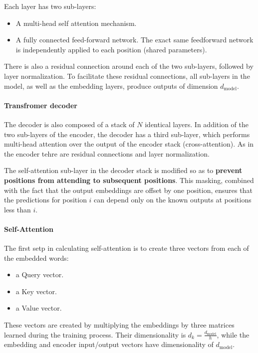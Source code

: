 Each layer has two sub-layers:
\begin{itemize}
  \item A multi-head self attention mechanism.
  \item A fully connected feed-forward network. The exact same feedforward network is independently applied to each position (shared parameters).
\end{itemize}

There is also a residual connection around each of the two sub-layers, followed by layer normalization.
To facilitate these residual connections, all sub-layers in the model, as well as the embedding layers, produce outputs of dimension $d_{\text{model}}$.

\paragraph{Transfromer decoder}
The decoder is also composed of a stack of $N$ identical layers.
In addition of the two sub-layers of the encoder, the decoder has a third sub-layer, which performs multi-head attention over the output of the encoder stack (cross-attention).
As in the encoder tehre are residual connections and layer normalization.

The self-attention sub-layer in the decoder stack is modified so as to \textbf{prevent positions from attending to subsequent positions}.
This masking, combined with the fact that the output embeddings are offset by one position, ensures that the predictions for position $i$ can depend only on the known outputs at positions less than $i$.

\paragraph{Self-Attention}
The first setp in calculating self-attention is to create three vectors from each of the embedded words:
\begin{itemize}
  \item a Query vector.
  \item a Key vector.
  \item a Value vector.
\end{itemize}

These vectors are created by multiplying the embeddings by three matrices learned during the training process.
Their dimensionality is $d_k = \frac{d_{\text{model}}}{h}$, while the embedding and encoder input/output vectors have dimensionality of $d_{\text{model}}$.

